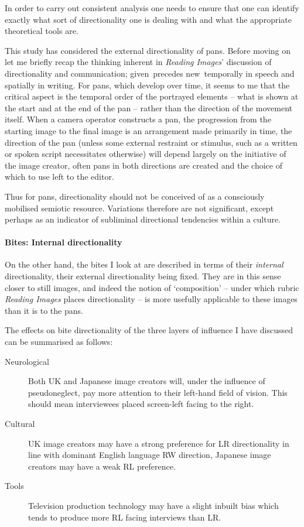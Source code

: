 \documentclass[11pt, oneside, a4paper]{scrartcl}
\newcommand{\nw} {{\sc new}}
\newcommand{\gv} {{\sc given}}
\begin{document}
In order to carry out consistent analysis one needs to ensure that one can identify exactly what sort of directionality one is dealing with and what the appropriate theoretical tools are. 

This study has considered the external directionality of pans. Before moving on let me briefly recap the thinking inherent in \emph{Reading Images}' discussion of directionality and communication; \gv\ precedes \nw\ temporally in speech and spatially in writing. For pans, which develop over time, it seems to me that the critical aspect is the temporal order of the portrayed elements -- what is shown at the start and at the end of the pan -- rather than the direction of the movement itself. When a camera operator constructs a pan, the progression from the starting image to the final image is an arrangement made primarily in time, the direction of the pan (unless some external restraint or stimulus, such as a written or spoken script necessitates otherwise) will depend largely on the initiative of the image creator, often pans in both directions are created and the choice of which to use left to the editor.

Thus for pans, directionality should not be conceived of as a consciously mobilised semiotic resource. Variations therefore are not significant, except perhaps as an indicator of subliminal directional tendencies within a culture.


\paragraph{Bites: Internal directionality}
On the other hand, the bites I look at are described in terms of their \emph{internal} directionality, their external directionality being fixed. They are in this sense closer to still images, and indeed the notion of `composition' -- under which rubric \emph{Reading Images} places directionality -- is more usefully applicable to these images than it is to the pans. 

The effects on bite directionality of the three layers of influence I have discussed can be summarised as follows:

\begin{description}
\item[Neurological] Both UK and Japanese image creators will, under the influence of pseudoneglect, pay more attention to their left-hand field of vision. This should mean interviewees placed screen-left facing to the right.
\item[Cultural] UK image creators may have a strong preference for LR directionality in line with dominant English language RW direction, Japanese image creators may have a weak RL preference.
\item[Tools] Television production technology may have a slight inbuilt bias which tends to produce more RL facing interviews than LR.
\end{description}
\end{document}
